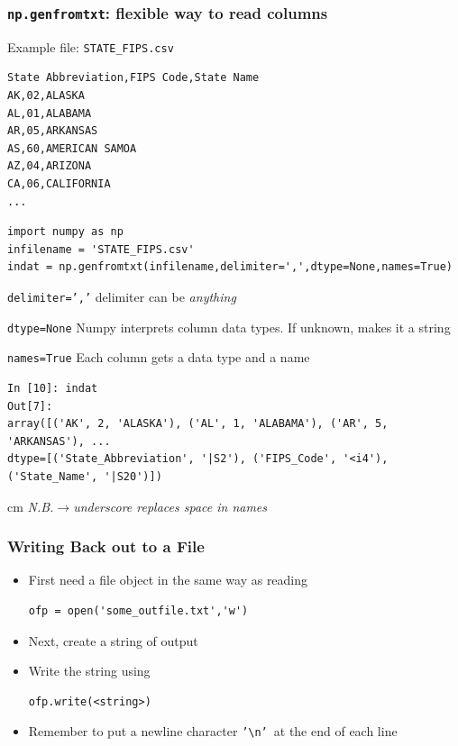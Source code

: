 \documentclass{beamer}
\begin{document}
\begin{frame}[fragile]
\frametitle{\texttt{np.genfromtxt}: flexible way to read columns}

Example file: \texttt{STATE\_FIPS.csv} 
\begin{tiny}
\begin{verbatim}
State Abbreviation,FIPS Code,State Name
AK,02,ALASKA
AL,01,ALABAMA
AR,05,ARKANSAS
AS,60,AMERICAN SAMOA
AZ,04,ARIZONA
CA,06,CALIFORNIA
...
\end{verbatim}
\end{tiny}
\pause
\begin{lstlisting}
import numpy as np
infilename = 'STATE_FIPS.csv'
indat = np.genfromtxt(infilename,delimiter=',',dtype=None,names=True)
\end{lstlisting}
\pause
\begin{description}
\begin{tiny}
\item[\texttt{delimiter=','}] delimiter can be \emph{anything}
\item[\texttt{dtype=None}] Numpy interprets column data types. If unknown, makes it a string
\item[\texttt{names=True}] Each column gets a data type and a name
\end{tiny}
\end{description}
\pause
\begin{lstlisting}
In [10]: indat
Out[7]: 
array([('AK', 2, 'ALASKA'), ('AL', 1, 'ALABAMA'), ('AR', 5, 'ARKANSAS'), ... 
dtype=[('State_Abbreviation', '|S2'), ('FIPS_Code', '<i4'), ('State_Name', '|S20')])
\end{lstlisting}
\pause
{} cm \emph{N.B.$\rightarrow$underscore replaces space in names}
\end{frame}

\begin{frame}[fragile]
\frametitle{Writing Back out to a File}
\begin{itemize}
\item First need a file object in the same way as reading\\
\begin{lstlisting}
ofp = open('some_outfile.txt','w')
\end{lstlisting}
\item Next, create a string of output
\item Write the string using 
\begin{lstlisting}
ofp.write(<string>)
\end{lstlisting}
\item Remember to put a newline character \texttt{'\textbackslash n'}~at the end of each line 

\end{itemize}
\end{frame}
\end{document}
